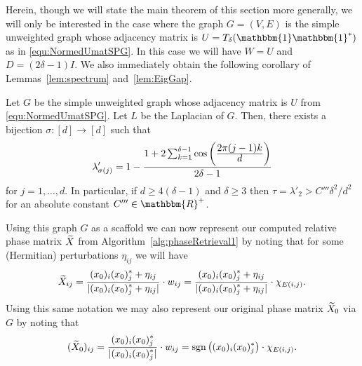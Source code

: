 Herein, though we will state the main theorem of this section more generally, we will only be interested in the case where the graph $G=(V,E)$ is the simple unweighted graph whose adjacency matrix is $U = T_{\delta}(\mathbbm{1} \mathbbm{1}^*)$ as in \eqref{equ:NormedUmatSPG}.  In this case we will have $W = U$ and $D = (2 \delta - 1)I$.  We also immediately obtain the following corollary of Lemmas~\ref{lem:spectrum} and~\ref{lem:EigGap}.

\begin{corollary}
Let $G$ be the simple unweighted graph whose adjacency matrix is $U$ from \eqref{equ:NormedUmatSPG}.  Let $L$ be the Laplacian of $G$.  Then, there exists a bijection $\sigma:[d] \rightarrow [d]$ such that
$$\lambda'_{\sigma(j)} = 1 - \frac{1 + 2 \sum_{k = 1}^{\delta - 1}\cos\left(\frac{\displaystyle 2\pi (j-1) k}{\displaystyle d}\right)}{2 \delta - 1}$$
for $j = 1, \dots, d$.  In particular, if $d \geq 4(\delta - 1)$ and $\delta \geq 3$ then $\tau = \lambda'_2 > C'''\delta^2 / d^2$ for an absolute constant $C''' \in \mathbbm{R}^+$.
\label{cor:Gspectrum}
\end{corollary}

Using this graph $G$ as a scaffold we can now represent our computed relative phase matrix $\widetilde{X}$ from Algorithm~\ref{alg:phaseRetrieval1} by noting that for some (Hermitian) perturbations $\eta_{ij}$ 
we will have 
\begin{equation}
\widetilde{X}_{ij} = \frac{\displaystyle (x_0)_i(x_0)_j^* + \eta_{ij}}{\displaystyle |(x_0)_i(x_0)_j^* + \eta_{ij}|} \cdot w_{ij} = \frac{\displaystyle (x_0)_i(x_0)_j^* + \eta_{ij}}{\displaystyle |(x_0)_i(x_0)_j^* + \eta_{ij}|} \cdot \chi_{E(i, j)}.
\label{equ:DeftildeXviaGcomp}
\end{equation}
 Using this same notation we may also represent our original phase matrix $\widetilde{X}_0$ %
via $G$ by noting that
\begin{equation}
(\widetilde{X}_0)_{ij} = \frac{\displaystyle (x_0)_i(x_0)_j^*}{\displaystyle |(x_0)_i(x_0)_j^*|} \cdot w_{ij} = \mathrm{sgn} \left( (x_0)_i(x_0)_j^* \right) \cdot \chi_{E(i, j)}.
\label{equ:DeftildeXviaGpure}
\end{equation}

